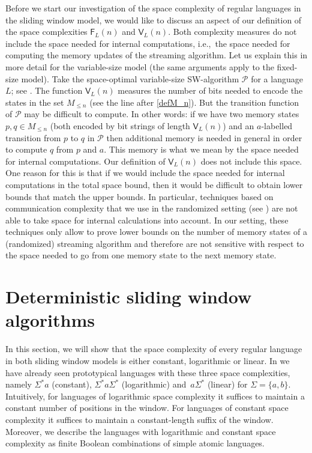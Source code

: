 \documentclass{theoretics}
\renewcommand{\P}{\mathcal{P}}
\newcommand{\F}{\mathsf{F}}
\newcommand{\V}{\mathsf{V}}
\renewcommand{\leq}{\leqslant}
\renewcommand{\le}{\leq}
\begin{document}
\begin{remark} \label{ref:internal comp}
Before we start our investigation of the space complexity of regular languages in the sliding window model, we would like to discuss 
an aspect of our definition of the space complexities $\F_L(n)$ and $\V_L(n)$. Both complexity measures do not 
include the space needed for internal computations, i.e.,~the space needed for computing the memory updates of the streaming algorithm. 
Let us explain this in more detail for the variable-size model (the same arguments apply to the fixed-size model). Take
the space-optimal variable-size SW-algorithm $\P$ for a language $L$; see .
The function $\V_L(n)$ measures the number of bits needed to encode the states in the set $M_{\le n}$ (see the line after \eqref{defM_n}).
But the transition function of $\P$ may be difficult to compute. In other words: if we have two memory states $p,q \in M_{\le n}$ 
(both encoded by bit strings of length $\V_L(n)$)
and an $a$-labelled transition from $p$ to $q$ in $\P$
 then additional memory is needed in general in order to compute $q$ from $p$ and $a$.
 This memory is what we mean by the space needed for internal computations. Our definition of $\V_L(n)$ does
 not include this space. One reason for this is that if we would include the space needed for internal computations
 in the total space bound, then it would be difficult to obtain lower bounds that match the upper bounds.
 In particular, techniques based
on communication complexity that we use in the randomized setting (see ) are not able to
take space for internal calculations into account. In our setting,
these techniques only allow to prove lower bounds on the number of memory states of a 
(randomized) streaming algorithm and therefore are not sensitive with respect to the space needed to 
go from one memory state to the next memory state.
\end{remark}


\section{Deterministic sliding window algorithms}

\label{chp:reg}

In this section, we will show that the space complexity of every regular language
in both sliding window models is either constant, logarithmic or linear.
In  we have already seen prototypical languages with these three space complexities,
namely $\Sigma^*a$ (constant), $\Sigma^*a\Sigma^*$ (logarithmic) and~$a\Sigma^*$ (linear) for $\Sigma = \{a,b\}$.
Intuitively, for languages of logarithmic space complexity it suffices to maintain a constant number
of positions in the window.
For languages of constant space complexity it suffices to maintain a constant-length suffix of the window.
Moreover, we describe the languages with logarithmic and constant space complexity
as finite Boolean combinations of simple atomic languages.
\end{document}
